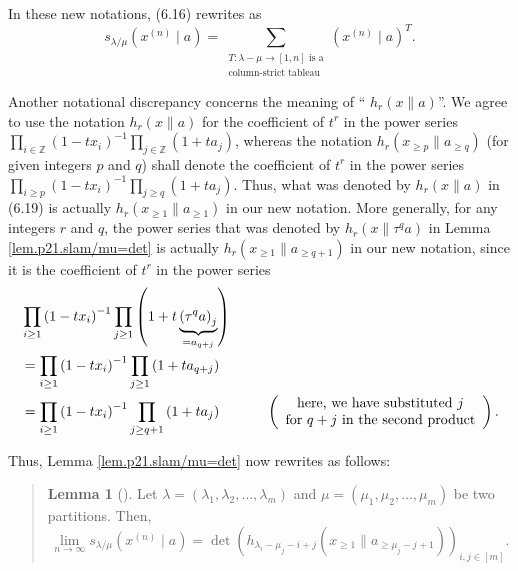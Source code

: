 \documentclass[numbers=enddot,12pt,final,onecolumn,notitlepage]{scrartcl}%
\newenvironment{statement}{\begin{quote}}{\end{quote}}
\theoremstyle{definition}
\newtheorem{lem}[theo]{Lemma}
\newenvironment{lemmain}[1][]
{\begin{statement}\begin{lem}[#1]}
{\end{lem}\end{statement}}
\newenvironment{lemmain}[1][Proof]{\noindent\textbf{#1.} }{\ \rule{0.5em}{0.5em}}
\let\sumnonlimits\sum
\let\prodnonlimits\prod
\renewcommand{\sum}{\sumnonlimits\limits}
\renewcommand{\prod}{\prodnonlimits\limits}
\begin{document}
\begin{enumerate}
In these new notations, (6.16) rewrites as%
\begin{equation}
s_{\lambda/\mu}\left(  x^{\left(  n\right)  }\mid a\right)  =\sum
_{\substack{T:\lambda-\mu\rightarrow\left[  1,n\right]  \text{ is
a}\\\text{column-strict tableau}}}\left(  x^{\left(  n\right)  }\mid a\right)
^{T}. \label{p22.6.21.6.16}%
\end{equation}


Another notational discrepancy concerns the meaning of \textquotedblleft%
$h_{r}\left(  x\parallel a\right)  $\textquotedblright. We agree to use the
notation $h_{r}\left(  x\parallel a\right)  $ for the coefficient of $t^{r}$
in the power series $\prod_{i\in\mathbb{Z}}\left(  1-tx_{i}\right)  ^{-1}%
\prod_{j\in\mathbb{Z}}\left(  1+ta_{j}\right)  $, whereas the notation
$h_{r}\left(  x_{\geq p}\parallel a_{\geq q}\right)  $ (for given integers $p$
and $q$) shall denote the coefficient of $t^{r}$ in the power series
$\prod_{i\geq p}\left(  1-tx_{i}\right)  ^{-1}\prod_{j\geq q}\left(
1+ta_{j}\right)  $. Thus, what was denoted by $h_{r}\left(  x\parallel
a\right)  $ in (6.19) is actually $h_{r}\left(  x_{\geq1}\parallel a_{\geq
1}\right)  $ in our new notation. More generally, for any integers $r$ and
$q$, the power series that was denoted by $h_{r}\left(  x\parallel\tau
^{q}a\right)  $ in Lemma \ref{lem.p21.slam/mu=det} is actually $h_{r}\left(
x_{\geq1}\parallel a_{\geq q+1}\right)  $ in our new notation, since it is the
coefficient of $t^{r}$ in the power series
\begin{align*}
&  \prod_{i\geq1}\left(  1-tx_{i}\right)  ^{-1}\prod_{j\geq1}\left(
1+t\underbrace{\left(  \tau^{q}a\right)  _{j}}_{=a_{q+j}}\right) \\
&  =\prod_{i\geq1}\left(  1-tx_{i}\right)  ^{-1}\prod_{j\geq1}\left(
1+ta_{q+j}\right) \\
&  =\prod_{i\geq1}\left(  1-tx_{i}\right)  ^{-1}\prod_{j\geq q+1}\left(
1+ta_{j}\right)  \ \ \ \ \ \ \ \ \ \ \left(
\begin{array}
[c]{c}%
\text{here, we have substituted }j\\
\text{for }q+j\text{ in the second product}%
\end{array}
\right)  .
\end{align*}


Thus, Lemma \ref{lem.p21.slam/mu=det} now rewrites as follows:

\begin{lemmain}
\label{lem.p21.slam/mu=det.ver2}Let $\lambda=\left(  \lambda_{1},\lambda
_{2},\ldots,\lambda_{m}\right)  $ and $\mu=\left(  \mu_{1},\mu_{2},\ldots
,\mu_{m}\right)  $ be two partitions. Then,%
\[
\lim\limits_{n\rightarrow\infty}s_{\lambda/\mu}\left(  x^{\left(  n\right)
}\mid a\right)  =\det\left(  h_{\lambda_{i}-\mu_{j}-i+j}\left(  x_{\geq
1}\parallel a_{\geq\mu_{j}-j+1}\right)  \right)  _{i,j\in\left[  m\right]  }.
\]


\end{lemmain}
\end{enumerate}
\end{document}
